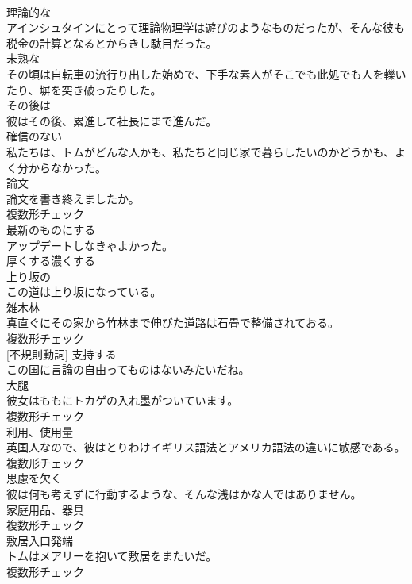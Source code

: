 \documentclass[8pt]{extreport}
\begin{document}
\begin{CJK}{UTF8}{min}
\\	[形容詞]	理論的な	
\\	アインシュタインにとって理論物理学は遊びのようなものだったが、そんな彼も税金の計算となるとからきし駄目だった。	
\\	[形容詞]	未熟な	
\\	その頃は自転車の流行り出した始めで、下手な素人がそこでも此処でも人を轢いたり、塀を突き破ったりした。	
\\	[副詞]	その後は	
\\	彼はその後、累進して社長にまで進んだ。	
\\	[形容詞]	確信のない	
\\	私たちは、トムがどんな人かも、私たちと同じ家で暮らしたいのかどうかも、よく分からなかった。	
\\	[名詞]	論文	
\\	論文を書き終えましたか。	
\\	複数形チェック
\\	[動詞]	最新のものにする	
\\	アップデートしなきゃよかった。	
\\	[動詞]	厚くする濃くする	
\\	[形容詞]	上り坂の	
\\	この道は上り坂になっている。	
\\	[名詞]	雑木林	
\\	真直ぐにその家から竹林まで伸びた道路は石畳で整備されておる。	
\\	複数形チェック
\\	[動詞] [不規則動詞]	支持する	
\\	この国に言論の自由ってものはないみたいだね。	
\\	[名詞]	大腿	
\\	彼女はももにトカゲの入れ墨がついています。	
\\	複数形チェック
\\	[名詞]	利用、使用量	
\\	英国人なので、彼はとりわけイギリス語法とアメリカ語法の違いに敏感である。	
\\	複数形チェック
\\	[形容詞]	思慮を欠く	
\\	彼は何も考えずに行動するような、そんな浅はかな人ではありません。	
\\	[名詞]	家庭用品、器具	
\\	複数形チェック
\\	[名詞]	敷居入口発端	
\\	トムはメアリーを抱いて敷居をまたいだ。	
\\	複数形チェック

\end{CJK}
\end{document}

